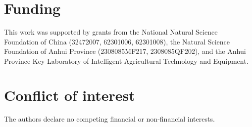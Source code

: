 \documentclass[11pt,a4paper]{article}
\begin{document}
\section*{Funding}

This work was supported by grants from the National Natural Science Foundation of China (32472007, 62301006, 62301008), the Natural Science Foundation of Anhui Province (2308085MF217, 2308085QF202), and the Anhui Province Key Laboratory of Intelligent Agricultural Technology and Equipment.

\section*{Conflict of interest}

The authors declare no competing financial or non-financial interests.



\end{document}
